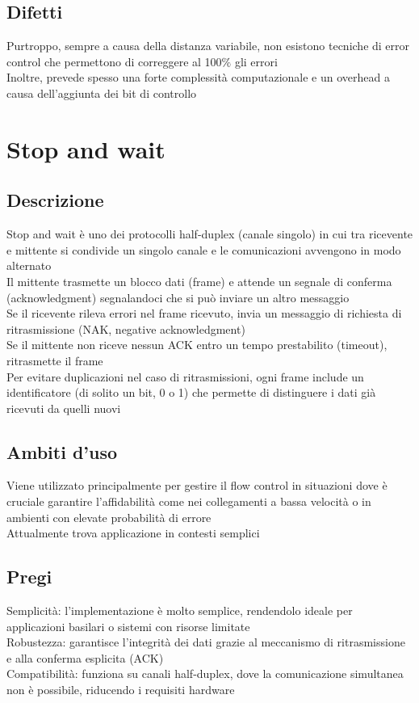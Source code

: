 \documentclass[10pt,oneside,a4paper]{article}
\begin{document}
\subsection{Difetti}
Purtroppo, sempre a causa della distanza variabile, non esistono tecniche di error control che permettono di correggere al 100$\%$ gli errori\\
Inoltre, prevede spesso una forte complessità computazionale e un overhead a causa dell'aggiunta dei bit di controllo
\section{Stop and wait}
\subsection{Descrizione}
Stop and wait è uno dei protocolli half-duplex (canale singolo) in cui tra ricevente e mittente si condivide un singolo canale e le comunicazioni avvengono in modo alternato\\
Il mittente trasmette un blocco dati (frame) e attende un segnale di conferma (acknowledgment) segnalandoci che si può inviare un altro messaggio\\
Se il ricevente rileva errori nel frame ricevuto, invia un messaggio di richiesta di ritrasmissione (NAK, negative acknowledgment)\\
Se il mittente non riceve nessun ACK entro un tempo prestabilito (timeout), ritrasmette il frame\\
Per evitare duplicazioni nel caso di ritrasmissioni, ogni frame include un identificatore (di solito un bit, 0 o 1) che permette di distinguere i dati già ricevuti da quelli nuovi
\subsection{Ambiti d'uso}
Viene utilizzato principalmente per gestire il flow control in situazioni dove è cruciale garantire l'affidabilità come nei collegamenti a bassa velocità o in ambienti con elevate probabilità di errore\\
Attualmente trova applicazione in contesti semplici
\subsection{Pregi}
Semplicità: l'implementazione è molto semplice, rendendolo ideale per applicazioni basilari o sistemi con risorse limitate\\
Robustezza: garantisce l'integrità dei dati grazie al meccanismo di ritrasmissione e alla conferma esplicita (ACK)\\
Compatibilità: funziona su canali half-duplex, dove la comunicazione simultanea non è possibile, riducendo i requisiti hardware
\end{document}
